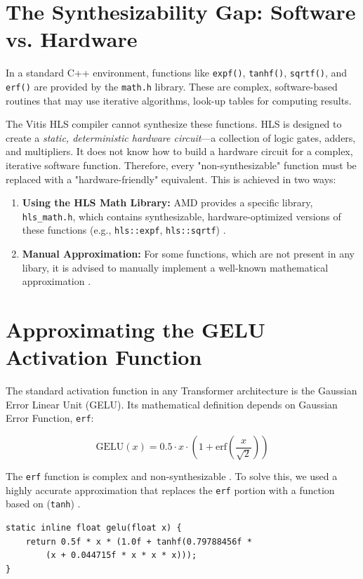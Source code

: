 \section{The Synthesizability Gap: Software vs. Hardware}

In a standard C++ environment, functions like \texttt{expf()}, \texttt{tanhf()}, \texttt{sqrtf()}, and \texttt{erf()} are provided by the \texttt{math.h} library. These are complex, software-based routines that may use iterative algorithms, look-up tables for computing results.

The Vitis HLS compiler cannot synthesize these functions. HLS is designed to create a \textit{static, deterministic hardware circuit}—a collection of logic gates, adders, and multipliers. It does not know how to build a hardware circuit for a complex, iterative software function.
Therefore, every "non-synthesizable" function must be replaced with a "hardware-friendly" equivalent. This is achieved in two ways:
\begin{enumerate}
    \item \textbf{Using the HLS Math Library:} AMD provides a specific library, \texttt{hls\_math.h}, which contains synthesizable, hardware-optimized versions of these functions (e.g., \texttt{hls::expf}, \texttt{hls::sqrtf}) \cite{ref12}.
    \item \textbf{Manual Approximation:} For some functions, which are not present in any libary, it is advised to manually implement a well-known mathematical approximation \cite{ref4, ref5}.
\end{enumerate}

\section{Approximating the GELU Activation Function}

The standard activation function in any Transformer architecture is the Gaussian Error Linear Unit (GELU). Its mathematical definition depends on Gaussian Error Function, \texttt{erf}:

\[
\text{GELU}(x) = 0.5 \cdot x \cdot \left( 1 + \text{erf}\left(\frac{x}{\sqrt{2}}\right) \right)
\]

The \texttt{erf} function is complex and non-synthesizable \cite{ref5}. To solve this, we used a highly accurate approximation that replaces the \texttt{erf} portion with a function based on (\texttt{tanh}) \cite{ref6}.
\begin{verbatim}
static inline float gelu(float x) {
    return 0.5f * x * (1.0f + tanhf(0.79788456f *
        (x + 0.044715f * x * x * x)));
}
\end{verbatim}

